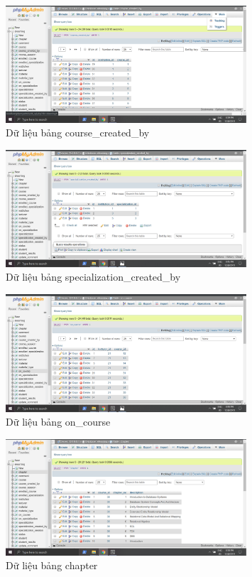 \documentclass[12pt,a4paper,titlepage]{article}
\begin{document}
\newpage
\begin{figure}[h!]
	\centering
	\caption{Dữ liệu bảng course_created_by}
	\includegraphics[width=0.8\textwidth]{images/dat4.png}
\end{figure}
\begin{figure}[h!]
	\centering
	\caption{Dữ liệu bảng specialization_created_by}
	\includegraphics[width=0.8\textwidth]{images/dat15.png}
\end{figure}
\begin{figure}[h!]
	\centering
	\caption{Dữ liệu bảng on_course}
	\includegraphics[width=0.8\textwidth]{images/dat12.png}
\end{figure}
\newpage
\begin{figure}[h!]
	\centering
	\caption{Dữ liệu bảng chapter}
	\includegraphics[width=0.8\textwidth]{images/dat1.png}
\end{figure}
\end{document}
